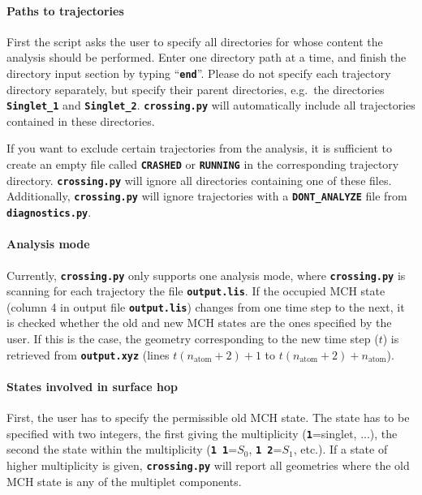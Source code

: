 \documentclass[a4paper,10pt,DIV=15,openany]{scrbook}
\newcommand{\ttt}[1]{\textbf{\texttt{#1}}}
\begin{document}
\paragraph{Paths to trajectories}

First the script asks the user to specify all directories for whose content the analysis should be performed. Enter one directory path at a time, and finish the directory input section by typing ``\ttt{end}''. Please do not specify each trajectory directory separately, but specify their parent directories, e.g.\ the directories \ttt{Singlet\_1} and \ttt{Singlet\_2}. \ttt{crossing.py} will automatically include all trajectories contained in these directories.

If you want to exclude certain trajectories from the analysis, it is sufficient to create an empty file called \ttt{CRASHED} or \ttt{RUNNING} in the corresponding trajectory directory. \ttt{crossing.py} will ignore all directories containing one of these files.
Additionally, \ttt{crossing.py} will ignore trajectories with a \ttt{DONT\_ANALYZE} file from \ttt{diagnostics.py}.

\paragraph{Analysis mode}

Currently, \ttt{crossing.py} only supports one analysis mode, where \ttt{crossing.py} is scanning for each trajectory the file \ttt{output.lis}. If the occupied MCH state (column 4 in output file \ttt{output.lis}) changes from one time step to the next, it is checked whether the old and new MCH states are the ones specified by the user. If this is the case, the geometry corresponding to the new time step ($t$) is retrieved from \ttt{output.xyz} (lines $t(n_{\text{atom}}+2)+1$ to $t(n_{\text{atom}}+2)+n_{\text{atom}}$). 

\paragraph{States involved in surface hop}

First, the user has to specify the permissible old MCH state. The state has to be specified with two integers, the first giving the multiplicity (\ttt{1}=singlet, ...), the second the state within the multiplicity (\ttt{1 1}=$S_0$, \ttt{1 2}=$S_1$, etc.). If a state of higher multiplicity is given, \ttt{crossing.py} will report all geometries where the old MCH state is any of the multiplet components. 
\end{document}
